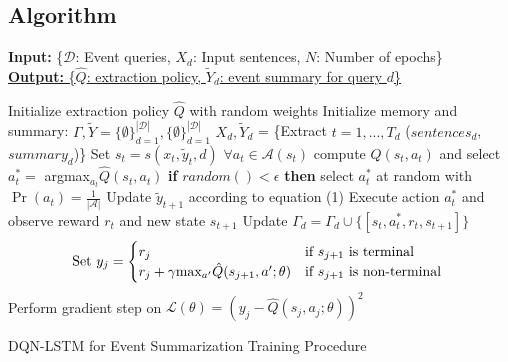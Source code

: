 \documentclass[]{beamer}
\begin{document}
\subsection{Algorithm}
\begin{frame}
\begin{algorithm}[H]
  \tiny
        \textbf{Input:} { \rm  \{$\mathcal{D}$: Event queries, $X_d$: Input sentences, $N$: Number of epochs\} } \\
        \underline{\textbf{Output:} \rm \{$\hat{Q}$: extraction policy, $\tilde{Y}_d$: event summary for query $d$\} }
\begin{algorithmic}[1]
    \STATE \rm Initialize extraction policy $\hat{Q}$ with random weights
    \STATE \rm Initialize memory and summary: $\Gamma, \tilde{Y} =  \{\emptyset \}^{\mathcal{|D|}}_{d=1},  \{\emptyset \}^{\mathcal{|D|}}_{d=1} $
            \STATE $X_{d}, \tilde{Y}_{d}$ = \{Extract $t=1,...,T_d$ ($sentences_d$, $summary_d$)\}
                \STATE Set $s_t = s(x_t, \tilde{y}_t, d)$
                \STATE $ \forall a_t \in \mathcal{A}(s_t)$ \textrm{compute} $\hat{Q}(s_t, a_t)$ and select $a^{*}_t =$ argmax$_{a_{t}}\hat{Q}(s_t, a_t)$
                \STATE  \textbf{if} $random() < \epsilon$ \textbf{then} select $a^{*}_t $ at random with $\Pr(a_t) =\frac{1}{| \mathcal{A} |} $
                \STATE Update $\tilde{y}_{t+1}$ according to equation (1)
                \STATE Execute action $a^{*}_t$ and observe reward $r_t$ and new state $s_{t+1}$
                \STATE Update $\Gamma_d = \Gamma_d \cup \{ [s_t, a^{*}_t, r_t, s_{t+1}]\}$
            \ENDFOR
        \ENDFOR
                \STATE \[\textrm{Set } y_j =
                        \begin{cases}
                            r_j                                             & \text{if $s_{j+1}$ is terminal } \\
                                r_j + \gamma $max$_{a'}\hat{Q}(s_{j+1}, a'; \theta)     & \text{if $s_{j+1}$ is non-terminal } 
                        \end{cases} 
                        \]
                        \STATE Perform gradient step on $\mathcal{L}(\theta) = (y_j - \hat{Q}(s_j, a_j; \theta))^2$
            \ENDFOR
    \ENDFOR
\end{algorithmic}
\caption*{ DQN-LSTM for Event Summarization Training Procedure}
\label{alg:seq}
\end{algorithm}
\end{frame}
\end{document}
